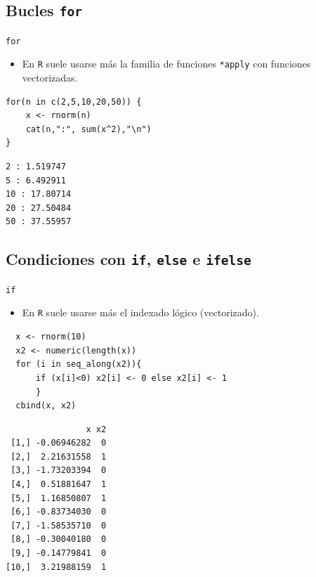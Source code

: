 \documentclass[xcolor={usenames,svgnames,dvipsnames}]{beamer}
\begin{document}
\subsection{Bucles \texttt{for}}
\label{sec-4-3}
\begin{frame}[fragile,label=sec-4-3-1]{\texttt{for}}
 \begin{itemize}
\item En \texttt{R} suele usarse más la familia de funciones \texttt{*apply} con funciones vectorizadas.
\end{itemize}
\lstset{language=R,label= ,caption= ,numbers=none}
\begin{lstlisting}
for(n in c(2,5,10,20,50)) {
    x <- rnorm(n)
    cat(n,":", sum(x^2),"\n")
}
\end{lstlisting}

\begin{verbatim}
2 : 1.519747 
5 : 6.492911 
10 : 17.80714 
20 : 27.50484 
50 : 37.55957
\end{verbatim}
\end{frame}

\subsection{Condiciones con \texttt{if}, \texttt{else} e \texttt{ifelse}}
\label{sec-4-4}
\begin{frame}[fragile,label=sec-4-4-1]{\texttt{if}}
 \begin{itemize}
\item En \texttt{R} suele usarse más el indexado lógico (vectorizado).
\end{itemize}
\lstset{language=R,label= ,caption= ,numbers=none}
\begin{lstlisting}
  x <- rnorm(10)
  x2 <- numeric(length(x))
  for (i in seq_along(x2)){
      if (x[i]<0) x2[i] <- 0 else x2[i] <- 1
      }
  cbind(x, x2)
\end{lstlisting}

\begin{verbatim}
                x x2
 [1,] -0.06946282  0
 [2,]  2.21631558  1
 [3,] -1.73203394  0
 [4,]  0.51881647  1
 [5,]  1.16850807  1
 [6,] -0.83734030  0
 [7,] -1.58535710  0
 [8,] -0.30040180  0
 [9,] -0.14779841  0
[10,]  3.21988159  1
\end{verbatim}
\end{frame}
\end{document}
